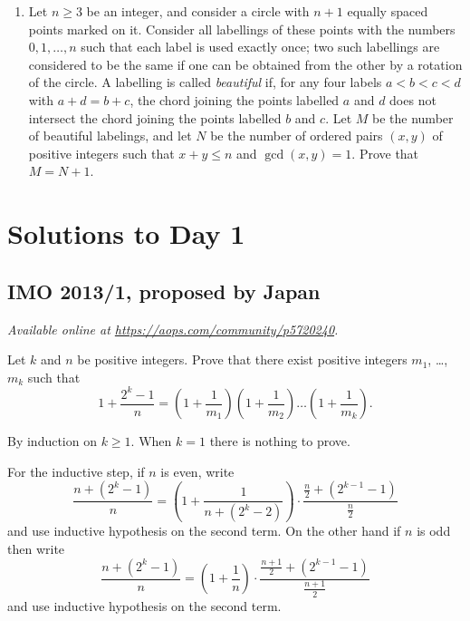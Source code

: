 \documentclass[11pt]{scrartcl}
\begin{document}
\begin{enumerate}[\bfseries 1.]
\item %
Let $n \ge 3$ be an integer,
and consider a circle with $n + 1$ equally spaced points marked on it.
Consider all labellings of these points with the numbers
$0, 1, \dots , n$ such that each label is used exactly once;
two such labellings are considered to be the same if
one can be obtained from the other by a rotation of the circle.
A labelling is called \emph{beautiful} if,
for any four labels $a < b < c < d$ with $a + d = b + c$,
the chord joining the points labelled $a$ and $d$
does not intersect the chord joining the points labelled $b$ and $c$.
Let $M$ be the number of beautiful labelings,
and let $N$ be the number of ordered pairs $(x, y)$ of positive integers
such that $x + y \le n$ and $\gcd(x, y) = 1$.
Prove that $M = N + 1$.

\end{enumerate}
\pagebreak

\section{Solutions to Day 1}
\subsection{IMO 2013/1, proposed by Japan}
\textsl{Available online at \url{https://aops.com/community/p5720240}.}
\begin{mdframed}[style=mdpurplebox,frametitle={Problem statement}]
Let  $k$ and $n$ be positive integers.
Prove that there exist positive integers $m_1$, \dots, $m_k$
such that
\[ 1 + \frac{2^k-1}{n}
  = \left( 1 + \frac{1}{m_1} \right)
  \left( 1 + \frac{1}{m_2} \right)
  \dots
  \left( 1 + \frac{1}{m_k} \right).
\]
\end{mdframed}
By induction on $k \ge 1$.
When $k = 1$ there is nothing to prove.

For the inductive step, if $n$ is even, write
\[
  \frac{n + (2^k-1)}{n}
  = \left( 1 + \frac{1}{n + (2^k-2)} \right)
  \cdot \frac{\frac n2 + (2^{k-1}-1)}{\frac n2}
\]
and use inductive hypothesis on the second term.
On the other hand if $n$ is odd then write
\[
  \frac{n + (2^k-1)}{n}
  = \left( 1 + \frac{1}{n} \right)
  \cdot \frac{\frac{n+1}{2} + (2^{k-1}-1)}{\frac{n+1}2}
\]
and use inductive hypothesis on the second term.
\pagebreak
\end{document}
